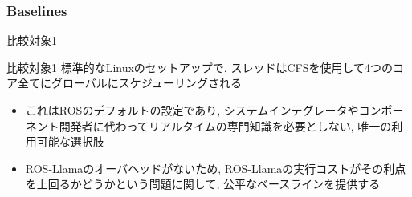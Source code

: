 


\subsubsection{Baselines}
\label{sssec: baselines}

\begin{frame}{比較対象1}
    \begin{block}{比較対象1}
        標準的なLinuxのセットアップで, スレッドはCFSを使用して4つのコア全てにグローバルにスケジューリングされる
    \end{block}
    \vspace{5mm}
    \begin{itemize}
        \item これはROSのデフォルトの設定であり, システムインテグレータやコンポーネント開発者に代わってリアルタイムの専門知識を必要としない, 唯一の利用可能な選択肢
        \item ROS-Llamaのオーバヘッドがないため, ROS-Llamaの実行コストがその利点を上回るかどうかという問題に関して, 公平なベースラインを提供する
    \end{itemize}
\end{frame}

